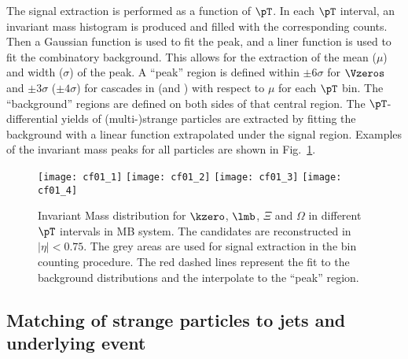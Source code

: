 \documentclass[ALICE,manyauthors]{cernphprep}
\begin{document}
The signal extraction is performed as a function of $\pT$.
In each $\pT$ interval, an invariant mass histogram is produced and filled with the corresponding counts.
Then a Gaussian function is used to fit the peak, and a liner function is used to fit the combinatory background.
This allows for the extraction of the mean ($\mu$) and width ($\sigma$) of the peak.
A ``peak'' region is defined within $\pm 6\sigma$ for $\Vzeros$ and $\pm 3\sigma$ ($\pm 4\sigma$) for cascades in \pp (and \pPb) with respect to $\mu$ for each $\pT$ bin.
The ``background'' regions are defined on both sides of that central region.
The $\pT$-differential yields of (multi-)strange particles are extracted by fitting the background with a linear function extrapolated under the signal region.
Examples of the invariant mass peaks for all particles are shown in Fig.~\ref{fig:InvM}.
\begin{figure}[!ht]
	\begin{center}
		\texttt{[image: cf01\_1]}
		\texttt{[image: cf01\_2]}
		\texttt{[image: cf01\_3]}
		\texttt{[image: cf01\_4]}
		\caption{Invariant Mass distribution for $\kzero$, $\lmb$, $\Xi$ and $\Omega$ in different $\pT$ intervals in MB \pPb system. The candidates are reconstructed in $|\eta|<0.75$.
			The grey areas are used for signal extraction in the bin counting procedure.
			The red dashed lines represent the fit to the background distributions and the interpolate to the ``peak'' region.}
		\label{fig:InvM}
	\end{center}
\end{figure}

\subsection{Matching of strange particles to jets and underlying event}%
\label{sec:ParJetMatch}
\end{document}

